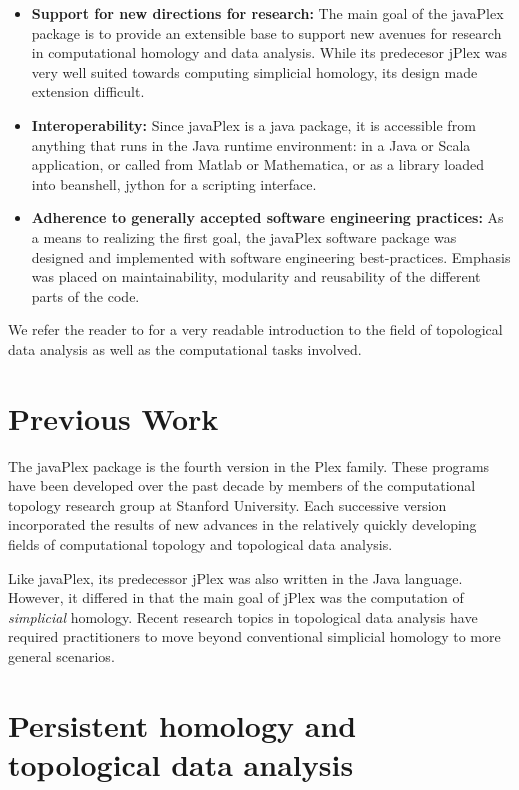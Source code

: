 \documentclass[runningheads,a4paper]{llncs}
\begin{document}
\begin{itemize}
\item {\bf Support for new directions for research: } The main goal of the javaPlex package is to provide an extensible base to support new avenues for research in computational homology and data analysis. While its predecesor jPlex was very well suited towards computing simplicial homology, its design made extension difficult.
\item {\bf Interoperability: } Since javaPlex is a java package, it is
  accessible from anything that runs in the Java runtime environment:
  in a Java or Scala application, or called from Matlab or Mathematica, or as a
  library loaded into beanshell, jython for a scripting interface.
\item {\bf Adherence to generally accepted software engineering practices: } As a means to realizing the first goal, the javaPlex software package was designed and implemented with software engineering best-practices. Emphasis was placed on maintainability, modularity and reusability of the different parts of the code.
\end{itemize}

We refer the reader to \cite{Carlsson_09} for a very readable introduction to the field of topological data analysis as well as the computational tasks involved.

\section{Previous Work}

The javaPlex package is the fourth version in the Plex family. These programs have been developed over the past decade by members of the computational topology research group at Stanford University. Each successive version incorporated the results of new advances in the relatively quickly developing fields of computational topology and topological data analysis.

Like javaPlex, its predecessor jPlex was also written in the Java language. However, it differed in that the main goal of jPlex was the computation of \emph{simplicial} homology. Recent research topics in topological data analysis have required practitioners to move beyond conventional simplicial homology to more general scenarios.

\section{Persistent homology and topological data analysis}
\label{sec:pers-homol-topol}
\end{document}
